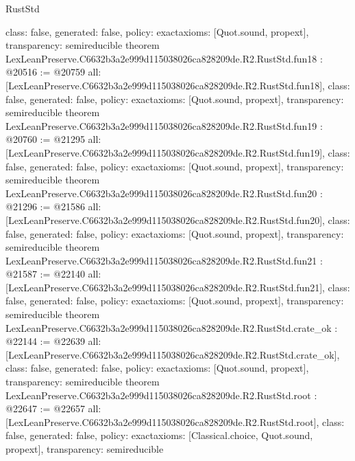 \begin{lexlean}{RustStd}
\begin{coremodule}
{  class: false,
  generated: false,
  policy: exact{axioms: [Quot.sound, propext]},
  transparency: semireducible
}
theorem LexLeanPreserve.C6632b3a2e999d115038026ca828209de.R2.RustStd.fun18 : @20516 := @20759 {
  all: [LexLeanPreserve.C6632b3a2e999d115038026ca828209de.R2.RustStd.fun18],
  class: false,
  generated: false,
  policy: exact{axioms: [Quot.sound, propext]},
  transparency: semireducible
}
theorem LexLeanPreserve.C6632b3a2e999d115038026ca828209de.R2.RustStd.fun19 : @20760 := @21295 {
  all: [LexLeanPreserve.C6632b3a2e999d115038026ca828209de.R2.RustStd.fun19],
  class: false,
  generated: false,
  policy: exact{axioms: [Quot.sound, propext]},
  transparency: semireducible
}
theorem LexLeanPreserve.C6632b3a2e999d115038026ca828209de.R2.RustStd.fun20 : @21296 := @21586 {
  all: [LexLeanPreserve.C6632b3a2e999d115038026ca828209de.R2.RustStd.fun20],
  class: false,
  generated: false,
  policy: exact{axioms: [Quot.sound, propext]},
  transparency: semireducible
}
theorem LexLeanPreserve.C6632b3a2e999d115038026ca828209de.R2.RustStd.fun21 : @21587 := @22140 {
  all: [LexLeanPreserve.C6632b3a2e999d115038026ca828209de.R2.RustStd.fun21],
  class: false,
  generated: false,
  policy: exact{axioms: [Quot.sound, propext]},
  transparency: semireducible
}
theorem LexLeanPreserve.C6632b3a2e999d115038026ca828209de.R2.RustStd.crate_ok : @22144 := @22639 {
  all: [LexLeanPreserve.C6632b3a2e999d115038026ca828209de.R2.RustStd.crate_ok],
  class: false,
  generated: false,
  policy: exact{axioms: [Quot.sound, propext]},
  transparency: semireducible
}
theorem LexLeanPreserve.C6632b3a2e999d115038026ca828209de.R2.RustStd.root : @22647 := @22657 {
  all: [LexLeanPreserve.C6632b3a2e999d115038026ca828209de.R2.RustStd.root],
  class: false,
  generated: false,
  policy: exact{axioms: [Classical.choice, Quot.sound, propext]},
  transparency: semireducible
}


\end{coremodule}
\end{lexlean}
